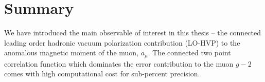 



\section{Summary}
\label{sec:2pt:summary}


We have introduced the main observable of interest in this thesis -- the connected leading order hadronic vacuum polarization contribution (LO-HVP) to the anomalous magnetic moment of the muon, $a_{\mu}$.
The connected two point correlation function which dominates the error contribution to the muon $g-2$ comes with high computational cost for sub-percent precision.

